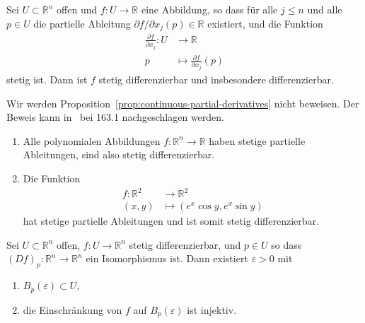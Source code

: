 \documentclass[../main.tex]{subfiles}
\begin{document}
\begin{proposition}\label{prop:continuous-partial-derivatives}
  Sei $U \subset \mathbb{R}^n$ offen und
  $f \colon U \to \mathbb{R}$ eine Abbildung,
  so dass für alle $j \leq n$ und alle $p \in U$
  die partielle Ableitung $\partial f/ \partial x_j (p) \in \mathbb{R}$
  existiert, und die Funktion
  \begin{align*}
    \frac{\partial f}{\partial x_j} \colon U & \to \mathbb{R} \\
    p & \mapsto \frac{\partial f}{\partial x_j}(p)
  \end{align*}
  stetig ist.
  Dann ist $f$ stetig differenzierbar und insbesondere differenzierbar.
\end{proposition}

Wir werden Proposition~\ref{prop:continuous-partial-derivatives}
nicht beweisen. Der Beweis kann
in~\cite{heuser} bei 163.1 nachgeschlagen werden.

\begin{examples}
  \leavevmode
  \begin{enumerate}[(1)]
    \item Alle polynomialen Abbildungen $f \colon \mathbb{R}^n \to \mathbb{R}$
      haben stetige partielle Ableitungen, sind also
      stetig differenzierbar.
    \item Die Funktion
      \begin{align*}
        f \colon \mathbb{R}^2 & \to \mathbb{R}^2 \\
        (x, y) & \mapsto (e^x \cos y, e^x \sin y)
      \end{align*}
      hat stetige partielle Ableitungen und ist somit stetig
      differenzierbar.
  \end{enumerate}
\end{examples}

\begin{proposition}\label{prop:local-injectivity}
  Sei $U \subset \mathbb{R}^n$ offen,
  $f \colon U \to \mathbb{R}^n$ stetig differenzierbar,
  und $p \in U$ so dass
  ${(Df)}_p \colon \mathbb{R}^n \to \mathbb{R}^n$
  ein Isomorphismus ist.
  Dann existiert $\varepsilon > 0$ mit
  \begin{enumerate}[\normalfont(i)]
    \item $B_p(\varepsilon) \subset U$,
    \item die Einschränkung von $f$ auf $B_p(\varepsilon)$ ist
      injektiv.
  \end{enumerate}
\end{proposition}
\end{document}
